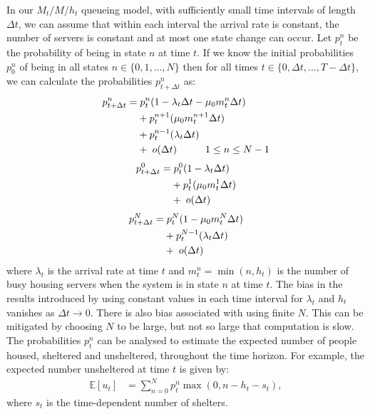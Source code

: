 \documentclass[12pt,a4paper]{article}
\begin{document}
In our $M_t/M/h_t$ queueing model, with sufficiently small time intervals of length $\Delta t$, we can assume that within each interval the arrival rate is constant, the number of servers is constant and at most one state change can occur. Let $p^{n}_{t}$ be the probability of being in state $n$ at time $t$. If we know the initial probabilities $p^{n}_{0}$ of being in all states $n \in \{0,1,...,N\}$ then for all times $t \in \{0, \Delta t,...,T-\Delta t\}$, we can calculate the probabilities $p^{n}_{t + \Delta t}$ as: 
% 
\begin{align*}
  p^n_{t+\Delta t} = & \hspace{0.1cm} p^{n}_{t}(1-\lambda_t\Delta t-\mu_0 m^n_t \Delta t) \\
                    & + p^{n+1}_{t}(\mu_0 m^{n+1}_t \Delta t) \\
                    & + p^{n-1}_t(\lambda_t \Delta t) \\
                    & + \hspace{0.1cm} o(\Delta t) \hspace{1cm} 1 \leq n \leq N-1
\end{align*}
% 
\begin{align*}
  p^0_{t+\Delta t} = & \hspace{0.1cm} p^{0}_{t}(1-\lambda_t\Delta t) \\
                    & + p^{1}_t(\mu_0 m^{1}_t \Delta t) \\
                    & + \hspace{0.1cm} o(\Delta t)
\end{align*}
% 
\begin{align*}
  p^N_{t+\Delta t} = & \hspace{0.1cm} p^{N}_{t}(1-\mu_0 m^N_t \Delta t) \\
                    & + p^{N-1}_t(\lambda_t \Delta t) \\
                    & + \hspace{0.1cm} o(\Delta t)
\end{align*}
% 
where $\lambda_t$ is the arrival rate at time $t$ and $m^n_t = \min(n,h_t)$ is the number of busy housing servers when the system is in state $n$ at time $t$. The bias in the results introduced by using constant values in each time interval for $\lambda_t$ and $h_t$ vanishes as $\Delta t \to 0$. There is also bias associated with using finite $N$. This can be mitigated by choosing $N$ to be large, but not so large that computation is slow. The probabilities $p^n_t$ can be analysed to estimate the expected number of people housed, sheltered and unsheltered, throughout the time horizon. For example, the expected number unsheltered at time $t$ is given by:
%
\begin{align} \label{u_t_mmt}
\mathbb{E}[u_t] & = \sum_{n=0}^{N} p^n_t \max(0,n-h_t-s_t), 
\end{align}
%
where $s_t$ is the time-dependent number of shelters.
\end{document}

